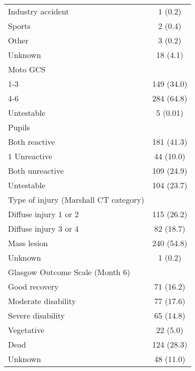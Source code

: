 \documentclass{article}
\begin{document}
\begin{table}[H]
\begin{center}
\begin{tabular}{lc}
\hspace{1 em} Industry accident & 1 (0.2)\\
\hspace{1 em} Sports & 2 (0.4)\\
\hspace{1 em} Other & 3 (0.2)\\
\hspace{1 em} Unknown & 18 (4.1)\\
Moto GCS & \\
\hspace{1 em} 1-3 & 149 (34.0)\\
\hspace{1 em} 4-6 & 284 (64.8)\\
\hspace{1 em} Untestable & 5 (0.01)\\
Pupils & \\
\hspace{1 em} Both reactive & 181 (41.3)\\
\hspace{1 em} 1 Unreactive & 44 (10.0)\\
\hspace{1 em} Both unreactive & 109 (24.9)\\
\hspace{1 em} Untestable & 104 (23.7)\\
Type of injury (Marshall CT category) & \\
\hspace{1 em} Diffuse injury 1 or 2 & 115 (26.2)\\
\hspace{1 em} Diffuse injury 3 or 4 & 82 (18.7)\\
\hspace{1 em} Mass lesion & 240 (54.8)\\
\hspace{1 em} Unknown & 1 (0.2) \\
Glasgow Outcome Scale (Month 6)& \\
\hspace{1 em} Good recovery & 71 (16.2)\\
\hspace{1 em} Moderate disability & 77 (17.6)\\
\hspace{1 em} Severe disability & 65 (14.8)\\
\hspace{1 em} Vegetative & 22 (5.0)\\
\hspace{1 em} Dead & 124 (28.3)\\
\hspace{1 em} Unknown & 48 (11.0)\\
\hline
\end{tabular}
\end{center}
\label{demog}
\end{table}%
\end{document}
